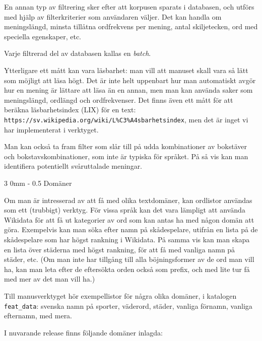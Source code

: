 \documentclass[11pt, a4paper, twoside]{article}
\makeatletter
\renewcommand{\subsubsection}{\@startsection
  {subsubsection}%
  {3}%
  {0mm}%
  {-\baselineskip}%
  {0.5\baselineskip}%
  {\bfseries\sffamily}}%
\makeatother
\begin{document}
En annan typ av filtrering sker efter att korpusen sparats i databasen, och utförs med hjälp av filterkriterier som användaren väljer. Det kan handla om meningslängd, minsta tillåtna ordfrekvens per mening, antal skiljetecken, ord med speciella egenskaper, etc.

Varje filtrerad del av databasen kallas en {\em batch}.

Ytterligare ett mått kan vara läsbarhet: man vill att manuset skall vara så lätt som möjligt att läsa högt. Det är inte helt uppenbart hur man automatiskt avgör hur en mening är lättare att läsa än en annan, men man kan använda saker som meningslängd, ordlängd och ordfrekvenser. Det finns även ett mått för att beräkna läsbarhetsindex (LIX) för en text: {\tt https://sv.wikipedia.org/wiki/L\%C3\%A4sbarhetsindex}, men det är inget vi har implementerat i verktyget.

Man kan också ta fram filter som slår till på udda kombinationer av bokstäver och bokstavskombinationer, som inte är typiska för språket. På så vis kan man identifiera potentiellt svåruttalade meningar.


\subsubsection{Domäner}

Om man är intresserad av att få med olika textdomäner, kan ordlistor användas som ett (trubbigt) verktyg. För vissa språk kan det vara lämpligt att använda Wikidata för att få ut kategorier av ord som kan antas ha med någon domän att göra. Exempelvis kan man söka efter namn på skådespelare, utifrån en lista på de skådespelare som har högst rankning i Wikidata. På samma vis kan man skapa en lista över städerna med högst rankning, för att få med vanliga namn på städer, etc. (Om man inte har tillgång till alla böjningsformer av de ord man vill ha, kan man leta efter de eftersökta orden också som prefix, och med lite tur få med mer av det man vill ha.)

Till manusverktyget hör exempellistor för några olika domäner, i katalogen {\tt feat\_data}: svenska namn på sporter, väderord, städer, vanliga förnamn, vanliga efternamn, med mera.

I nuvarande release finns följande domäner inlagda:
\end{document}
